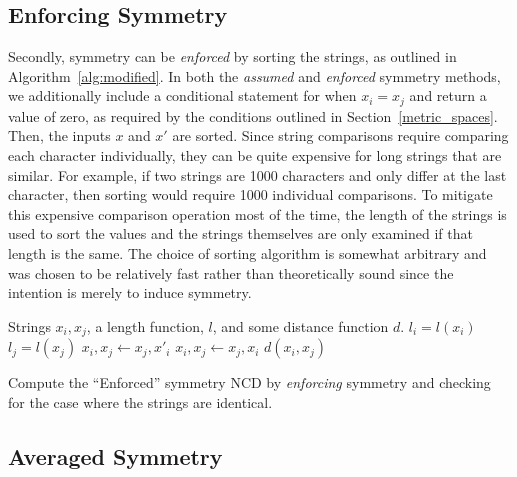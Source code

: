 \documentclass[preprint,12pt]{elsarticle}
\begin{document}
\subsection{Enforcing Symmetry}
Secondly, symmetry can be \textit{enforced} by sorting the strings, as outlined in Algorithm~\ref{alg:modified}.
In both the \textit{assumed} and \textit{enforced} symmetry methods, we additionally include a conditional statement for when $x_i = x_j$ and return a value of zero, as required by the conditions outlined in Section~\ref{metric_spaces}. 
Then, the inputs $x$ and $x'$ are sorted. 
Since string comparisons require comparing each character individually, they can be quite expensive for long strings that are similar.
For example, if two strings are 1000 characters and only differ at the last character, then sorting would require 1000 individual comparisons.
To mitigate this expensive comparison operation most of the time, the length of the strings is used to sort the values and the strings themselves are only examined if that length is the same. 
The choice of sorting algorithm is somewhat arbitrary and was chosen to be relatively fast rather than theoretically sound since the intention is merely to induce symmetry. 

\begin{algorithm}
    \begin{algorithmic}
        \Require Strings $x_i, x_j$, a length function, $l$, and some distance function $d$.
         
            \State {}
        \Else  {}
            \State $l_i = l(x_i)$
            \State $l_j = l(x_j)$
                 \State $x_i, x_j \gets x_j, x'_i$ 
                 
                     \State $x_i, x_j \gets x_j, x_i$ 
                \EndIf
            \EndIf
            \State \Return $d(x_i, x_j)$
        \EndIf
    \end{algorithmic}
    \caption{Compute the ``Enforced'' symmetry NCD by \textit{enforcing} symmetry and checking for the case where the strings are identical.}
    \label{alg:modified}
\end{algorithm}

\subsection{Averaged Symmetry}
\end{document}
